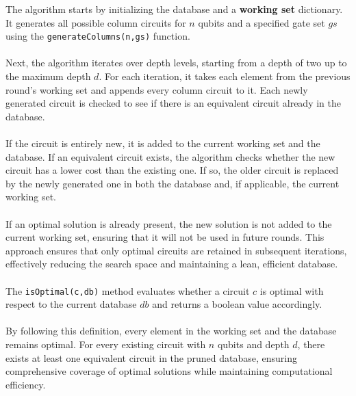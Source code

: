 The algorithm starts by initializing the database and a \textbf{working set} dictionary. It generates all possible column circuits for $n$ qubits and a specified gate set $gs$ using the \texttt{generateColumns(n,gs)} function.
\\\\
Next, the algorithm iterates over depth levels, starting from a depth of two up to the maximum depth 
$d$. For each iteration, it takes each element from the previous round's working set and appends every column circuit to it. Each newly generated circuit is checked to see if there is an equivalent circuit already in the database.
\\\\
If the circuit is entirely new, it is added to the current working set and the database. If an equivalent circuit exists, the algorithm checks whether the new circuit has a lower cost than the existing one. If so, the older circuit is replaced by the newly generated one in both the database and, if applicable, the current working set.
\\\\
If an optimal solution is already present, the new solution is not added to the current working set, ensuring that it will not be used in future rounds. This approach ensures that only optimal circuits are retained in subsequent iterations, effectively reducing the search space and maintaining a lean, efficient database.
\\\\
The \texttt{isOptimal(c,db)} method evaluates whether a circuit $c$ is optimal with respect to the current database $db$ and returns a boolean value accordingly.
\\\\
By following this definition, every element in the working set and the database remains optimal. For every existing circuit with $n$ qubits and depth $d$, there exists at least one equivalent circuit in the pruned database, ensuring comprehensive coverage of optimal solutions while maintaining computational efficiency.



